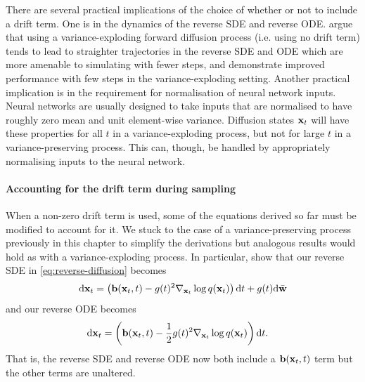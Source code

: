 There are several practical implications of the choice of whether or not to include a drift term. One is in the dynamics of the reverse SDE and reverse ODE. \citet{karras2022elucidating} argue that using a variance-exploding forward diffusion process (i.e. using no drift term) tends to lead to straighter trajectories in the reverse SDE and ODE which are more amenable to simulating with fewer steps, and demonstrate improved performance with few steps in the variance-exploding setting. Another practical implication is in the requirement for normalisation of neural network inputs. Neural networks are usually designed to take inputs that are normalised to have roughly zero mean and unit element-wise variance. Diffusion states ${\mathbf{x}}_t$ will have these properties for all $t$ in a variance-exploding process, but not for large $t$ in a variance-preserving process. This can, though, be handled by appropriately normalising inputs to the neural network.



\paragraph{Accounting for the drift term during sampling}
When a non-zero drift term is used, some of the equations derived so far must be modified to account for it. We stuck to the case of a variance-preserving process previously in this chapter to simplify the derivations but analogous results would hold as with a variance-exploding process. In particular, \citet{song2020score} show that our reverse SDE in \cref{eq:reverse-diffusion} becomes
\begin{equation} \label{eq:reverse-diffusion-with-drift}
    \mathrm{d}{\mathbf{x}}_t = \left( {\mathbf{b}}({\mathbf{x}}_t, t) - g(t)^2 \nabla_{{\mathbf{x}}_t} \log q({\mathbf{x}}_t) \right) \mathrm{d}t + g(t) \mathrm{d}\bar{{\mathbf{w}}}
\end{equation}
and our reverse ODE becomes
\begin{align}
    \mathrm{d}{\mathbf{x}}_t &= \left( {\mathbf{b}}({\mathbf{x}}_t, t) - \frac{1}{2} g(t)^2 \nabla_{{\mathbf{x}}_t} \log q({\mathbf{x}}_t) \right) \mathrm{d}t.
\end{align}
That is, the reverse SDE and reverse ODE now both include a ${\mathbf{b}}({\mathbf{x}}_t, t)$ term but the other terms are unaltered.


